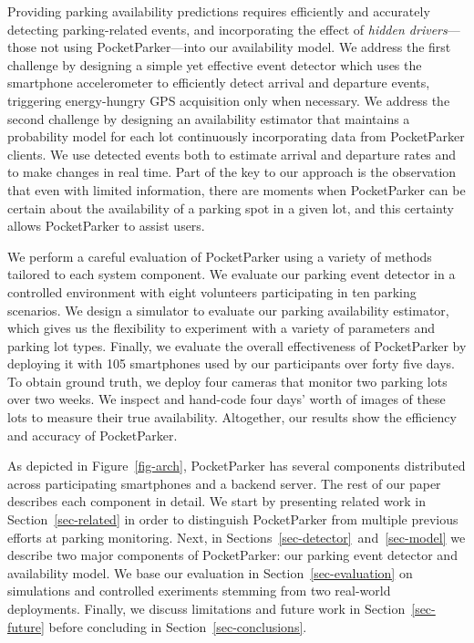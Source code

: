 Providing parking availability predictions requires efficiently and
accurately detecting parking-related events, and incorporating the effect of
\textit{hidden drivers}---those not using PocketParker---into our
availability model. We address the first challenge by designing a simple yet
effective event detector which uses the smartphone accelerometer to
efficiently detect arrival and departure events, triggering energy-hungry GPS
acquisition only when necessary. We address the second challenge by designing
an availability estimator that maintains a probability model for each lot
continuously incorporating data from PocketParker clients. We use detected
events both to estimate arrival and departure rates and to make changes in
real time. Part of the key to our approach is the observation that even with
limited information, there are moments when PocketParker can be certain about
the availability of a parking spot in a given lot, and this certainty allows 
PocketParker to assist users.

We perform a careful evaluation of PocketParker using a variety of methods
tailored to each system component. We evaluate our parking event detector in
a controlled environment with eight volunteers participating in ten parking
scenarios. We design a simulator to evaluate our parking availability
estimator, which gives us the flexibility to experiment with a variety of
parameters and parking lot types. Finally, we evaluate the overall
effectiveness of PocketParker by deploying it with 105 smartphones used by
our participants over forty five days. To obtain ground truth, we deploy four
cameras that monitor two parking lots over two weeks. We inspect and
hand-code four days' worth of images of these lots to measure their true
availability. Altogether, our results show the efficiency and accuracy
of PocketParker.

As depicted in Figure~\ref{fig-arch}, PocketParker has several components
distributed across participating smartphones and a backend server. The rest
of our paper describes each component in detail. We start by presenting
related work in Section~\ref{sec-related} in order to distinguish
PocketParker from multiple previous efforts at parking monitoring. Next, in
Sections~\ref{sec-detector}~and~\ref{sec-model} we describe two major 
components of PocketParker: our parking event detector and availability
model.  We base our evaluation in Section~\ref{sec-evaluation} on simulations
and controlled exeriments stemming from two real-world deployments.  Finally,
we discuss limitations and future work in Section~\ref{sec-future} before
concluding in Section~\ref{sec-conclusions}.

